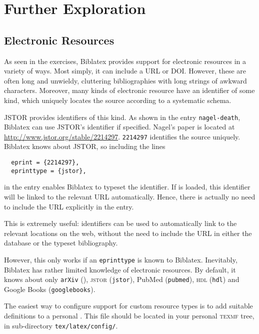 
\section<1-| beamer:0>{Further Exploration}\label{sec:pellach}

\subsection{Electronic Resources}\label{subsec:eres}

As seen in the exercises, Biblatex provides support for electronic resources in a variety of ways.
Most simply, it can include a URL or DOI.
However, these are often long and unwieldy, cluttering bibliographies with long strings of awkward characters.
Moreover, many kinds of electronic resource have an identifier of some kind, which uniquely locates the source according to a systematic schema.

JSTOR provides identifiers of this kind.
As shown in the entry \verb|nagel-death|, Biblatex can use JSTOR's identifier if specified.
Nagel's paper is located at \url{http://www.jstor.org/stable/2214297}.
\texttt{2214297} identifies the source uniquely.
Biblatex knows about JSTOR, so including the lines
\begin{verbatim}
  eprint = {2214297},
  eprinttype = {jstor},
\end{verbatim}
in the entry enables Biblatex to typeset the identifier.
If  is loaded, this identifier will be linked to the relevant URL automatically.
Hence, there is actually no need to include the URL explicitly in the entry.

This is extremely useful: identifiers can be used to automatically link to the relevant locations on the web, without the need to include the URL in either the database or the typeset bibliography.

However, this only works if an \texttt{eprinttype} is known to Biblatex.
Inevitably, Biblatex has rather limited knowledge of electronic resources.
By default, it knows about only \texttt{arXiv} (), \textsc{jstor} (\texttt{jstor}), PubMed (\texttt{pubmed}), \textsc{hdl} (\texttt{hdl}) and Google Books (\texttt{googlebooks}).

The easiest way to configure support for custom resource types is to add suitable definitions to a personal .
This file should be located in your personal \textsc{texmf} tree, in sub-directory \texttt{tex/latex/config/}.

